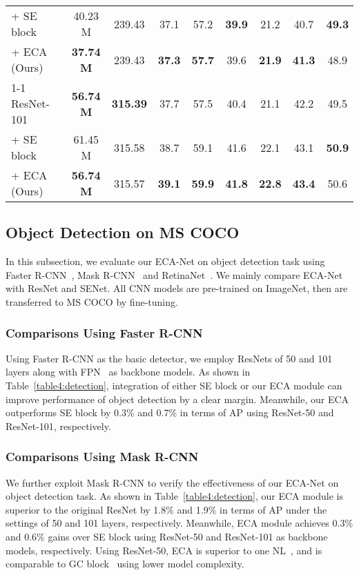 \documentclass[10pt,twocolumn,letterpaper]{article}
\begin{document}
\begin{table*}[t]
\begin{tabular}{l|c|c|c|c|c|c|c|c|c}
		+ SE block & & 40.23 M & 239.43 & 37.1 & 57.2 & \textbf{39.9} & 21.2 & 40.7 & \textbf{49.3} \\
		+ ECA (Ours) & & \textbf{37.74 M} & 239.43 & \textbf{37.3} & \textbf{57.7} & 39.6 & \textbf{21.9} & \textbf{41.3} & 48.9 \\
		\cline{1-1}\cline{3-10}
		ResNet-101 & & \textbf{56.74 M} & \textbf{315.39} & 37.7 & 57.5 & 40.4 & 21.1 & 42.2 & 49.5 \\
		+ SE block & & 61.45 M & 315.58 & 38.7 & 59.1 & 41.6 & 22.1 & 43.1 & \textbf{50.9} \\
		+ ECA (Ours) & & \textbf{56.74 M} & 315.57 & \textbf{39.1} & \textbf{59.9} & \textbf{41.8} & \textbf{22.8} &  \textbf{43.4} & 50.6 \\
		\hline
	\end{tabular}
	\smallskip
	\caption{Object detection results of different methods on COCO val2017.}
	\label{table4:detection}
\end{table*}

\subsection{Object Detection on MS COCO}
In this subsection, we evaluate our ECA-Net on object detection task using Faster R-CNN~\cite{DBLP:journals/pami/RenHG017}, Mask R-CNN~\cite{DBLP:conf/iccv/HeGDG17} and RetinaNet~\cite{DBLP:conf/iccv/LinGGHD17}. We mainly compare ECA-Net with ResNet and SENet. All CNN models are pre-trained on ImageNet, then are transferred to MS COCO by fine-tuning.  

\subsubsection{Comparisons Using Faster R-CNN}
Using Faster R-CNN as the basic detector, we employ ResNets of 50 and 101 layers along with FPN~\cite{DBLP:conf/cvpr/LinDGHHB17} as backbone models. As shown in Table~\ref{table4:detection}, integration of either SE block or our ECA module can improve performance of object detection by a clear margin. Meanwhile, our ECA outperforms SE block by 0.3\% and 0.7\% in terms of AP using ResNet-50 and ResNet-101, respectively. 

\vspace{-0.1cm}
\subsubsection{Comparisons Using Mask R-CNN}
We further exploit Mask R-CNN to verify the effectiveness of our ECA-Net on object detection task.  As shown in Table~\ref{table4:detection}, our ECA module is superior to the original ResNet by 1.8\% and 1.9\% in terms of AP under the settings of 50 and 101 layers, respectively. Meanwhile, ECA module achieves 0.3\% and 0.6\% gains over SE block using ResNet-50 and ResNet-101 as backbone models, respectively. Using ResNet-50, ECA is superior to one NL~\cite{Wang_2018_CVPR}, and is comparable to GC block~\cite{Cao_2019_ICCV_Workshops} using lower model complexity.
\end{document}
